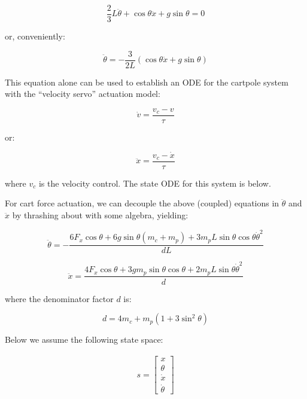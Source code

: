 \documentclass[twoside,11pt]{article}
\begin{document}
\begin{equation}
\frac{2}{3} L \ddot{\theta} + \cos{\theta} \ddot{x} + g \sin{\theta}  = 0
\end{equation}

or, conveniently:

\begin{equation}
\ddot{\theta} = - \frac{3}{2L} \left( \cos{\theta} \ddot{x} + g \sin{\theta} \right)
\end{equation}

This equation alone can be used to establish an ODE for the cartpole system with the ``velocity servo'' actuation model:

\begin{equation}
\dot{v} = \frac{v_c - v}{\tau}
\end{equation}

or:

\begin{equation}
\ddot{x} = \frac{v_c - \dot{x}}{\tau}
\end{equation}

where $v_c$ is the velocity control. The state ODE for this system is below.

For cart force actuation, we can decouple the above (coupled) equations in $\ddot{\theta}$ and $\ddot{x}$ by thrashing about with some algebra, yielding:


\begin{equation}
\ddot{\theta} = -\frac{6 F_x \cos{\theta} + 6 g \sin{\theta}\left( m_c + m_p \right) + 3 m_p L \sin{\theta}\cos{\theta}\dot{\theta}^2 }{d L}
\end{equation}


\begin{equation}
\ddot{x} = \frac{4 F_x \cos{\theta} + 3 g m_p \sin{\theta}\cos{\theta} + 2 m_p L \sin{\theta}\dot{\theta}^2 }{d}
\end{equation}

where the denominator factor $d$ is:

\begin{equation}
d = 4 m_c + m_p \left(1 + 3 \sin^2{\theta}\right)
\end{equation}

Below we assume the following state space:

\begin{align}
s = 
\begin{bmatrix}
x \\
\theta \\
\dot{x} \\
\dot{\theta} 
\end{bmatrix}
\end{align}
\end{document}
